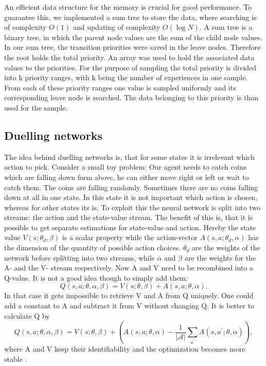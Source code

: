 \documentclass[12pt]{article}
\begin{document}
An efficient data structure for the memory is crucial for good performance.
To guarantee this, we implemented a sum tree to store the data, where searching is of complexity $O(1)$ and updating of complexity $O(\log N)$.
A sum tree is a binary tree, in which the parent node values are the sum of the child node values. In our sum tree, the transition priorities were saved in the leave nodes. Therefore the root holds the total priority. An array was used to hold the associated data values to the priorities. For the purpose of sampling the total priority is divided into k priority ranges, with k being the number of experiences in one sample.
From each of these priority ranges one value is sampled uniformly and its corresponding leave node is searched. The data belonging to this priority is than used for the sample.
\cite{DBLP:journals/corr/SchaulQAS15}
\subsection{Duelling networks}
The idea behind duelling networks is, that for some states it is irrelevant which action to pick.
Consider a small toy problem: Our agent needs to catch coins which are falling down form above, he can either move right or left or wait to catch them. The coins are falling randomly. Sometimes there are no coins falling down at all in one state. In this state it is not important which action is chosen, whereas for other states its is.
To exploit this the neural network is split into two streams: %
the action and the state-value stream. The benefit of this is, that it is possible to get separate estimations for state-value and action. Hereby the state value $V(s ; \theta_d, \beta)$ is a scalar property while the action-vector $A(s, a ; \theta_d, \alpha)$ has the dimension of the quantity of possible action choices. $\theta_d$ are the weights of the network before splitting into two streams, while $\alpha$ and $\beta$ are the weights for the A- and the V- stream respectively.
Now A and V need to be recombined into a Q-value. It is not a good idea though to simply add them:
\begin{equation}
Q(s, a ; \theta, \alpha, \beta)=V(s ; \theta, \beta)+A(s, a ; \theta, \alpha).
\end{equation}
In that case it gets impossible to retrieve V and A from Q uniquely. One could add a constant to A and subtract it from V without changing Q.
It is better to calculate Q by
\begin{equation}
Q(s, a ; \theta, \alpha, \beta)=V(s ; \theta, \beta)+ \left(A(s, a ; \theta, \alpha)-\frac{1}{|\mathcal{A}|} \sum_{a^{\prime}} A\left(s, a^{\prime} ; \theta, \alpha\right)\right),
\end{equation}
where A and V keep their identifiability and the optimization becomes more stable \cite{DBLP:journals/corr/WangFL15}.
\end{document}
